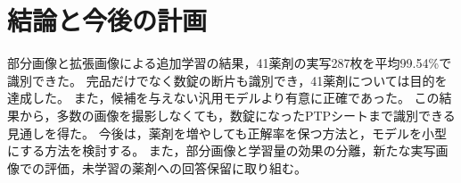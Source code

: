 \documentclass[a4paper,10pt,uplatex,dvipdfmx,twocolumn]{jsarticle}
\begin{document}
\section{結論と今後の計画}
部分画像と拡張画像による追加学習の結果，41薬剤の実写287枚を平均99.54\%で識別できた。
完品だけでなく数錠の断片も識別でき，41薬剤については目的を達成した。
また，候補を与えない汎用モデルより有意に正確であった。
この結果から，多数の画像を撮影しなくても，数錠になったPTPシートまで識別できる見通しを得た。
今後は，薬剤を増やしても正解率を保つ方法と，モデルを小型にする方法を検討する。
また，部分画像と学習量の効果の分離，新たな実写画像での評価，未学習の薬剤への回答保留に取り組む。

{\raggedright


}
\end{document}
